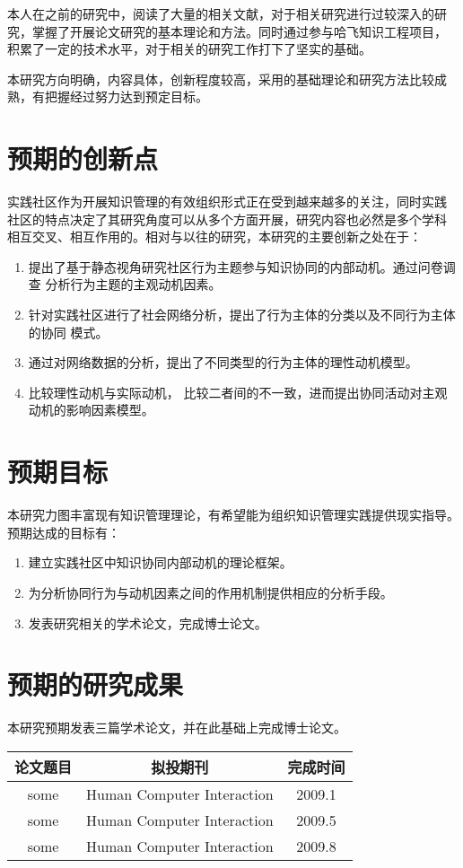 \documentclass[12pt,a4paper]{ctexart}
\begin{document}
本人在之前的研究中，阅读了大量的相关文献，对于相关研究进行过较深入的研
究，掌握了开展论文研究的基本理论和方法。同时通过参与哈飞知识工程项目，
积累了一定的技术水平，对于相关的研究工作打下了坚实的基础。

本研究方向明确，内容具体，创新程度较高，采用的基础理论和研究方法比较成
熟，有把握经过努力达到预定目标。
\section{预期的创新点}
实践社区作为开展知识管理的有效组织形式正在受到越来越多的关注，同时实践
社区的特点决定了其研究角度可以从多个方面开展，研究内容也必然是多个学科
相互交叉、相互作用的。相对与以往的研究，本研究的主要创新之处在于：
\begin{enumerate}
\item 提出了基于静态视角研究社区行为主题参与知识协同的内部动机。通过问卷调查
  分析行为主题的主观动机因素。
\item  针对实践社区进行了社会网络分析，提出了行为主体的分类以及不同行为主体的协同
  模式。
\item  通过对网络数据的分析，提出了不同类型的行为主体的理性动机模型。
\item  比较理性动机与实际动机，
  比较二者间的不一致，进而提出协同活动对主观动机的影响因素模型。
\end{enumerate}
\section{预期目标}
本研究力图丰富现有知识管理理论，有希望能为组织知识管理实践提供现实指导。
预期达成的目标有：
\begin{enumerate}
\item 建立实践社区中知识协同内部动机的理论框架。
\item  为分析协同行为与动机因素之间的作用机制提供相应的分析手段。
\item  发表研究相关的学术论文，完成博士论文。
\end{enumerate}
\section{预期的研究成果}
本研究预期发表三篇学术论文，并在此基础上完成博士论文。
\\[1em]
\begin{center}
  

\begin{tabular}[center]{|c|c|c|}
\hline
论文题目&拟投期刊&完成时间\\
\hline
  some &Human Computer Interaction&2009.1\\
\hline
some&Human Computer Interaction&2009.5\\
\hline
some&Human Computer Interaction&2009.8\\
\hline
\end{tabular}
\end{center}
\end{document}
